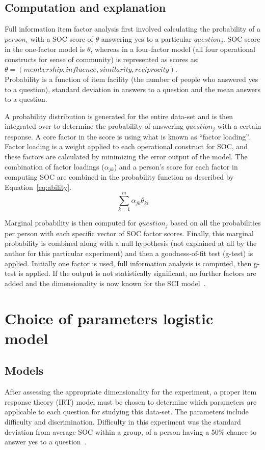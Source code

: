 \documentclass{sig-alternate}
\begin{document}
\subsection{Computation and explanation}
Full information item factor analysis first involved calculating the probability of a $person_i$ with a SOC score of $\theta$ answering yes to a particular $question_j$. SOC score in the one-factor model is $\theta$, whereas in a four-factor model (all four operational constructs for sense of community) is represented as scores as: \\$\theta = (membership, influence, similarity, reciprocity)$.\\ Probability is a function of item facility (the number of people who answered yes to a question), standard deviation in answers to a question and the mean answers to a question. 

A probability distribution is generated for the entire data-set and is then integrated over to determine the probability of answering $question_j$ with a certain response. A core factor in the score is using what is known as ``factor loading''. Factor loading is a weight applied to each operational construct for SOC, and these factors are calculated by minimizing the error output of the model. The combination of factor loadings ($\alpha_{jk}$) and a person's score for each factor in computing SOC are combined in the probability function as described by Equation~\ref{eq:ability}.
\begin{equation}
\label{eq:ability}
\sum\limits_{k = 1}^{m} \alpha_{jk} \theta_{ki}
\end{equation}

Marginal probability is then computed for $question_j$ based on all the probabilities per person with each specific vector of SOC factor scores. Finally, this marginal probability is combined along with a null hypothesis (not explained at all by the author for this particular experiment) and then a goodness-of-fit test (g-test) is applied. Initially one factor is used, full information analysis is computed, then g-test is applied. If the output is not statistically significant, no further factors are added and the dimensionality is now known for the SCI model~\cite{analysis:1988}.

\section{Choice of parameters logistic model}
\label{sec:parameterChoice}
\subsection{Models}
After assessing the appropriate dimensionality for the experiment, a proper item response theory (IRT) model must be chosen to determine which parameters are applicable to each question for studying this data-set. The parameters include difficulty and discrimination. Difficulty in this experiment was the standard deviation from average SOC within a group, of a person having a 50\% chance to answer yes to a question~\cite{disparities:2009}.
\end{document}
